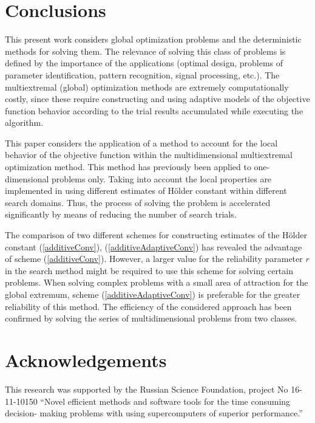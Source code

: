 \documentclass[procedia]{easychair}
\begin{document}
\section{Conclusions}
This present work considers global optimization problems and the deterministic methods
for solving them. The relevance of solving this class of problems is defined by the
importance of the applications (optimal design, problems of parameter identification,
pattern recognition, signal processing, etc.). The multiextremal (global) optimization
methods are extremely computationally costly, since these require constructing and using
adaptive models of the objective function behavior according to the trial results
accumulated while executing the algorithm.
\par
This paper considers the application of a method to account for the local behavior
of the objective function within the multidimensional multiextremal optimization method.
This method has previously been applied to one-dimensional problems only. Taking into
account the local properties are implemented in using different estimates of Hölder
constant within different search domains. Thus, the process of solving the problem is
accelerated significantly by means of reducing the number of search trials.
\par
The comparison of two different schemes for constructing estimates of the Hölder
constant (\ref{additiveConv}), (\ref{additiveAdaptiveConv}) has revealed the advantage
of scheme (\ref{additiveConv}). However, a larger value for the reliability parameter \(r\)
in the search method might be required to use this scheme for solving certain problems.
When solving complex problems with a small area of attraction for the global extremum,
scheme (\ref{additiveAdaptiveConv}) is preferable for the greater reliability of this method.
The efficiency of the considered approach has been confirmed by solving the series of
multidimensional problems from two classes.

\section{Acknowledgements}
This research was supported by the Russian Science Foundation, project No 16-11-10150
``Novel efficient methods and software tools for the time consuming decision- making problems
with using supercomputers of superior performance.''

%
\label{sect:bib}
%
%

%



\end{document}
